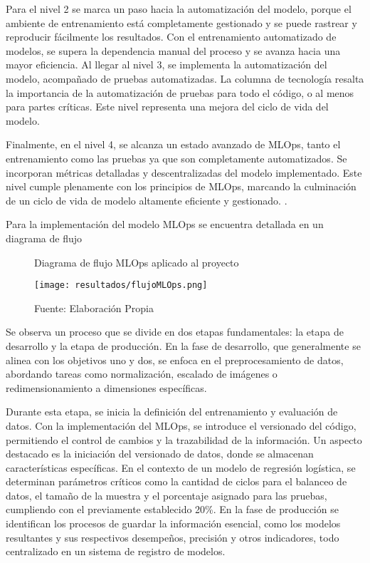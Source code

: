 Para el nivel 2 se marca un paso hacia la automatización del modelo, porque el ambiente de entrenamiento está completamente gestionado y se puede rastrear y reproducir fácilmente los resultados. Con el entrenamiento automatizado de modelos, se supera la dependencia manual del proceso y se avanza hacia una mayor eficiencia. Al llegar al nivel 3, se implementa la automatización del modelo, acompañado de pruebas automatizadas. La columna de tecnología resalta la importancia de la automatización de pruebas para todo el código, o al menos para partes críticas. Este nivel representa una mejora del ciclo de vida del modelo. \newline

Finalmente, en el nivel 4, se alcanza un estado avanzado de MLOps, tanto el entrenamiento como las pruebas ya que son completamente automatizados. Se incorporan métricas detalladas y descentralizadas del modelo implementado. Este nivel cumple plenamente con los principios de MLOps, marcando la culminación de un ciclo de vida de modelo altamente eficiente y gestionado. \citep{rivero2022, visengeriyeva2020}.

Para la implementación del modelo MLOps se encuentra detallada en un diagrama de flujo

\newpage

\begin{figure}[h]
\centering
\caption{Diagrama de flujo MLOps aplicado al proyecto}
\texttt{[image: resultados/flujoMLOps.png]}
\caption*{\footnotesize Fuente: Elaboración Propia}
\label{fig:figuraFlujoMLOps}
\end{figure}

Se observa un proceso que se divide en dos etapas fundamentales: la etapa de desarrollo y la etapa de producción. En la fase de desarrollo, que generalmente se alinea con los objetivos uno y dos, se enfoca en el preprocesamiento de datos, abordando tareas como normalización, escalado de imágenes o redimensionamiento a dimensiones específicas. \newline

Durante esta etapa, se inicia la definición del entrenamiento y evaluación de datos. Con la implementación del MLOps, se introduce el versionado del código, permitiendo el control de cambios y la trazabilidad de la información. Un aspecto destacado es la iniciación del versionado de datos, donde se almacenan características específicas. En el contexto de un modelo de regresión logística, se determinan parámetros críticos como la cantidad de ciclos para el balanceo de datos, el tamaño de la muestra y el porcentaje asignado para las pruebas, cumpliendo con el previamente establecido 20\%. En la fase de producción se identifican los procesos de guardar la información esencial, como los modelos resultantes y sus respectivos desempeños, precisión y otros indicadores, todo centralizado en un sistema de registro de modelos. \newline

